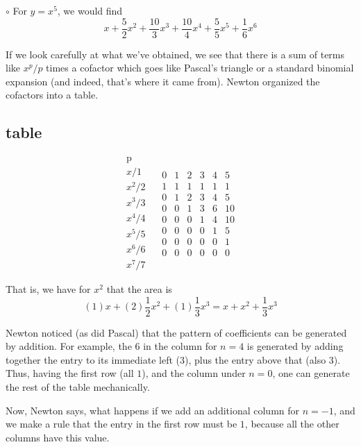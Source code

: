 \documentclass[11pt, oneside]{article}
\begin{document}
$\circ$  For $y = x^5$, we would find
\[ x + \frac{5}{2}x^2 + \frac{10}{3}x^3 + \frac{10}{4}x^4 + \frac{5}{5}x^5 + \frac{1}{6}x^6 \]

If we look carefully at what we've obtained, we see that there is a sum of terms like $x^p/p$ times a cofactor which goes like Pascal's triangle or a standard binomial expansion (and indeed, that's where it came from).  Newton organized the cofactors into a table.

\subsection*{table}

\[
\begin{matrix}
\text{p}  \\
x/1  \\
x^2/2 \\
x^3/3 \\
x^4/4 \\
x^5/5 \\
x^6/6 \\
x^7/7
\end{matrix} \ \ \ \
\begin{matrix}
0 & 1 & 2 & 3 & 4 & 5  \\
1 & 1 & 1 & 1 & 1 & 1  \\
0 & 1 & 2 & 3 & 4 & 5 \\
0 & 0 & 1 & 3 & 6 & 10 \\
0 & 0 & 0 & 1 & 4 & 10 \\
0 & 0 & 0 & 0 & 1 & 5 \\
0 & 0 & 0 & 0 & 0 & 1 \\
0 & 0 & 0 & 0 & 0 & 0
\end{matrix}
\]

That is, we have for $x^2$ that the area is
\[ (1)x + (2)\frac{1}{2}x^2 + (1)\frac{1}{3}x^3 = x + x^2 + \frac{1}{3}x^3 \]

Newton noticed (as did Pascal) that the pattern of coefficients can be generated by addition.  For example, the $6$ in the column for $n=4$ is generated by adding together the entry to its immediate left ($3$), plus the entry above that (also $3$).  Thus, having the first row (all $1$), and the column under $n=0$, one can generate the rest of the table mechanically.

Now, Newton says, what happens if we add an additional column for $n=-1$, and we make a rule that the entry in the first row must be $1$, because all the other columns have this value.
\end{document}
